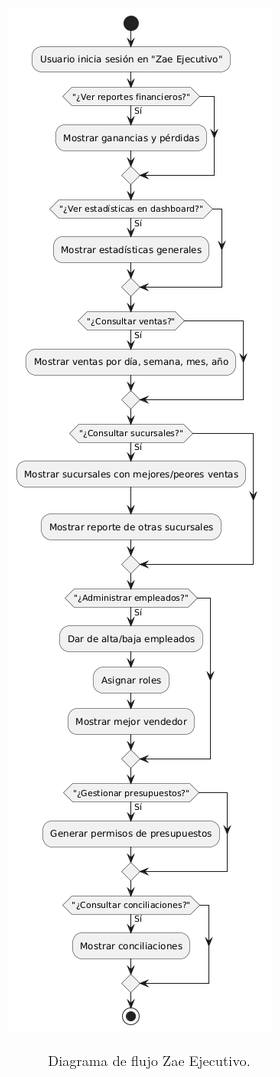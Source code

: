 \documentclass[protocolo.tex]{subfiles}
\begin{document}
\begin{center}
\includegraphics[scale=0.4]{Imagenes/zaeEjecutivo.png}
\end{center}
\begin{figure}[h]  %
    \centering
    \caption{Diagrama de flujo Zae Ejecutivo.}
    \label{fig:mi-figura7}
\end{figure}
\end{document}
